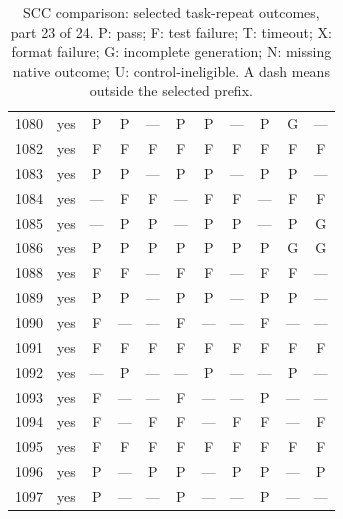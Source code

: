 \begin{table}[p]
\begin{tabular*}{\textwidth}{@{\extracolsep{\fill}}rc*{9}{c}@{}}
1080 & yes & P & P & — & P & P & — & P & G & —\\
1082 & yes & F & F & F & F & F & F & F & F & F\\
1083 & yes & P & P & — & P & P & — & P & P & —\\
1084 & yes & — & F & F & — & F & F & — & F & F\\
1085 & yes & — & P & P & — & P & P & — & P & G\\
1086 & yes & P & P & P & P & P & P & P & G & G\\
1088 & yes & F & F & — & F & F & — & F & F & —\\
1089 & yes & P & P & — & P & P & — & P & P & —\\
1090 & yes & F & — & — & F & — & — & F & — & —\\
1091 & yes & F & F & F & F & F & F & F & F & F\\
1092 & yes & — & P & — & — & P & — & — & P & —\\
1093 & yes & F & — & — & F & — & — & P & — & —\\
1094 & yes & F & — & F & F & — & F & F & — & F\\
1095 & yes & F & F & F & F & F & F & F & F & F\\
1096 & yes & P & — & P & P & — & P & P & — & P\\
1097 & yes & P & — & — & P & — & — & P & — & —\\
\bottomrule\end{tabular*}
\caption{SCC comparison: selected task-repeat outcomes, part 23 of 24. P: pass; F: test failure; T: timeout; X: format failure; G: incomplete generation; N: missing native outcome; U: control-ineligible. A dash means outside the selected prefix.}
\end{table}
\clearpage
